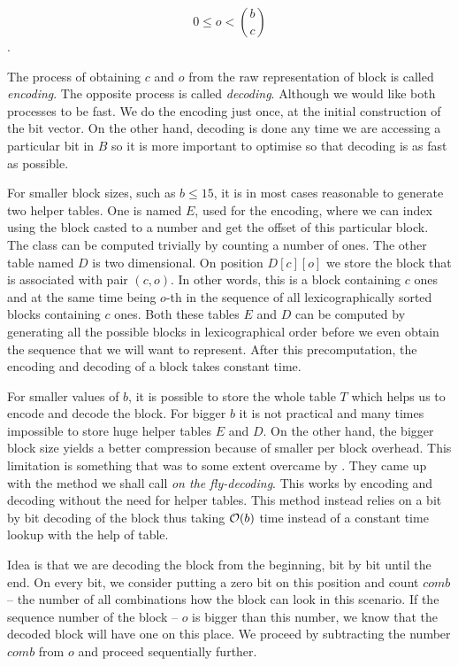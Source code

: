 				$$0 \leq o < {b\choose c}$$.

The process of obtaining $c$ and $o$ from the raw representation of block is called
\textit{encoding}. The opposite process is called \textit{decoding}. Although we would
like both processes to be fast. We do the encoding just once, at the initial construction
of the bit vector. On the other hand, decoding is done any time we are accessing a particular
bit in $B$ so it is more important to optimise so that decoding is as fast as possible.

For smaller block sizes, such as $b\leq 15$, it is in most cases reasonable to
generate two helper tables. One is named $E$, used for the encoding, where we can
index using the block casted to a number and get the offset of this particular block.
The class can be computed trivially by counting a number of ones. The other table
named $D$ is two dimensional. On position $D[c][o]$ we store the block that
is associated with pair $(c, o)$. In other words, this is a block containing $c$ ones
and at the same time being $o$-th in the sequence of all lexicographically sorted
blocks containing $c$ ones. Both these tables $E$ and $D$ can be computed
by generating all the possible blocks in lexicographical order before we even
obtain the sequence that we will want to represent. After this precomputation,
the encoding and decoding of a block takes constant time.

For smaller values of $b$, it is possible to store the whole table $T$ which helps us
to encode and decode the block. For bigger $b$ it is not practical and many times
impossible to store huge helper tables $E$ and $D$. On the other hand, the bigger
block size yields a better compression because of smaller per block overhead. This limitation
is something that was to some extent overcame by \cite{navarro2012fast}. They came up with the
method we shall call \textit{on the fly-decoding}. This works by encoding and decoding without
the need for helper tables. This method instead relies on a bit by bit decoding of the block
thus taking $\mathcal{O}(b)$ time instead of a constant time lookup with the help of table.

Idea is that we are decoding the block from the beginning, bit by bit until the end. On every bit,
we consider putting a zero bit on this position and count $comb$ -- the number of all
combinations how the block can look in this scenario. If the sequence number of the block --
$o$ is bigger than this number, we know that the decoded block will have one on this place.
We proceed by subtracting the number $comb$ from $o$ and proceed sequentially further.

